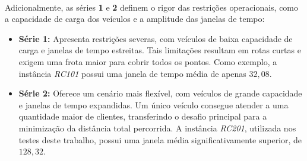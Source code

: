 \paragraph{} Adicionalmente, as séries \textbf{1} e \textbf{2} definem o rigor das restrições operacionais, como a capacidade de carga dos veículos e a amplitude das janelas de tempo:

\begin{itemize}
    \item \textbf{Série 1:} Apresenta restrições severas, com veículos de baixa capacidade de carga e janelas de tempo estreitas. Tais limitações resultam em rotas curtas e exigem uma frota maior para cobrir todos os pontos. Como exemplo, a instância \textit{RC101} possui uma janela de tempo média de apenas $32,08$.
    \item \textbf{Série 2:} Oferece um cenário mais flexível, com veículos de grande capacidade e janelas de tempo expandidas. Um único veículo consegue atender a uma quantidade maior de clientes, transferindo o desafio principal para a minimização da distância total percorrida. A instância \textit{RC201}, utilizada nos testes deste trabalho, possui uma janela média significativamente superior, de $128,32$.
\end{itemize}